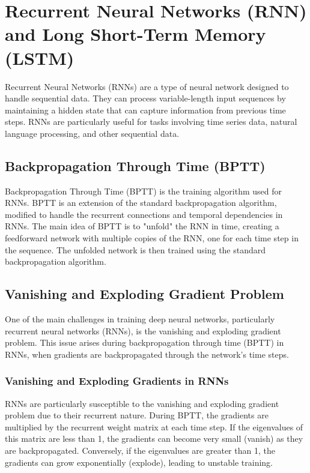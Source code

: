\documentclass[12pt]{article}
\begin{document}
\section{Recurrent Neural Networks (RNN) and Long Short-Term Memory (LSTM)}

Recurrent Neural Networks (RNNs) are a type of neural network designed to handle sequential data. They can process variable-length input sequences by maintaining a hidden state that can capture information from previous time steps. RNNs are particularly useful for tasks involving time series data, natural language processing, and other sequential data.

\subsection{Backpropagation Through Time (BPTT)}

Backpropagation Through Time (BPTT) is the training algorithm used for RNNs. BPTT is an extension of the standard backpropagation algorithm, modified to handle the recurrent connections and temporal dependencies in RNNs. The main idea of BPTT is to "unfold" the RNN in time, creating a feedforward network with multiple copies of the RNN, one for each time step in the sequence. The unfolded network is then trained using the standard backpropagation algorithm.

\subsection{Vanishing and Exploding Gradient Problem}

One of the main challenges in training deep neural networks, particularly recurrent neural networks (RNNs), is the vanishing and exploding gradient problem. This issue arises during backpropagation through time (BPTT) in RNNs, when gradients are backpropagated through the network's time steps.

\subsubsection{Vanishing and Exploding Gradients in RNNs}

RNNs are particularly susceptible to the vanishing and exploding gradient problem due to their recurrent nature. During BPTT, the gradients are multiplied by the recurrent weight matrix at each time step. If the eigenvalues of this matrix are less than 1, the gradients can become very small (vanish) as they are backpropagated. Conversely, if the eigenvalues are greater than 1, the gradients can grow exponentially (explode), leading to unstable training.
\end{document}
